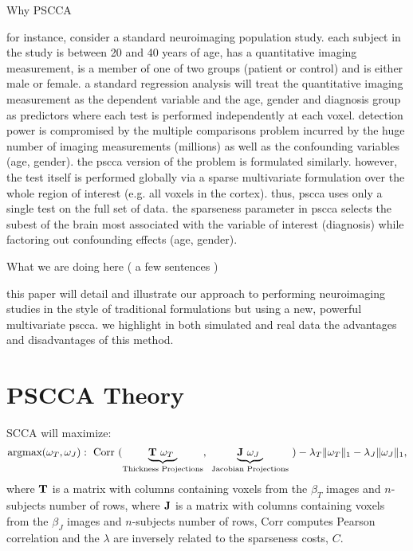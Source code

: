 \documentclass{llncs}
\begin{document}
Why PSCCA

for instance, consider a standard neuroimaging population study.  each
subject in the study is between 20 and 40 years of age, has a
quantitative imaging measurement, is a member of one of two groups
(patient or control) and is either male or female.  a standard
regression analysis will treat the quantitative imaging measurement as the dependent variable and the
age, gender and diagnosis group as predictors where each test is
performed independently at each voxel.  detection power is
compromised by the multiple comparisons problem incurred by the huge
number of imaging measurements (millions) as well as the confounding
variables (age, gender).  the pscca version of the
problem is formulated similarly.  however, the test itself is
performed globally via a sparse multivariate formulation over the
whole region of interest (e.g. all voxels in the cortex).  thus, pscca
uses only a single test on the full set of data.   the sparseness
parameter in pscca selects the subest of the brain most associated
with the variable of interest (diagnosis) while factoring out
confounding effects (age, gender).  

What we are doing here ( a few sentences )

this paper will detail and illustrate our approach to performing
neuroimaging studies in the style of traditional formulations but
using a new, powerful multivariate pscca.  we highlight in both
simulated and real data the advantages and disadvantages of this
method.

\section{PSCCA Theory}
SCCA will maximize:
\begin{equation}
\text{argmax}( \omega_T,\omega_{J}) :
 ~\text{Corr}~(\underbrace{  {\bf T} ~\omega_T~}_{\text{Thickness Projections}} ,~\underbrace{ {\bf J} ~\omega_{J}~}_{\text{Jacobian Projections}}~) - \lambda_T \| \omega_T \|_1 - \lambda_J \|  \omega_{J}  \|_1 , 
\end{equation} 
where ${\bf T}$ is a matrix with columns containing voxels from the $\beta_T$ images and $n$-subjects number of rows, 
where ${\bf J}$ is a matrix with columns containing voxels from the $\beta_J$ images and $n$-subjects number of rows, 
 Corr computes Pearson correlation and the
$\lambda$ are inversely related to the sparseness costs, $C$.  %
\end{document}

